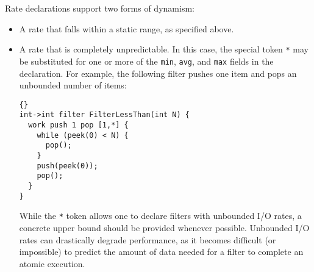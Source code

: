 \documentclass[11pt]{article}
\begin{document}
\noindent Rate declarations support two forms of dynamism:
\begin{itemize}

\item A rate that falls within a static range, as specified above.





\item A rate that is completely unpredictable.  In this case, the
special token \lstinline|*| may be substituted for one or more of the
\lstinline|min|, \lstinline|avg|, and \lstinline|max| fields in the
declaration.  For example, the following filter pushes one item and
pops an unbounded number of items:

\begin{lstlisting}{}
int->int filter FilterLessThan(int N) {
  work push 1 pop [1,*] {
    while (peek(0) < N) {
      pop();
    }
    push(peek(0));
    pop();
  }
}
\end{lstlisting}

While the \lstinline|*| token allows one to declare filters with
unbounded I/O rates, a concrete upper bound should be provided
whenever possible.  Unbounded I/O rates can drastically degrade
performance, as it becomes difficult (or impossible) to predict the
amount of data needed for a filter to complete an atomic execution.

\end{itemize}
\end{document}
